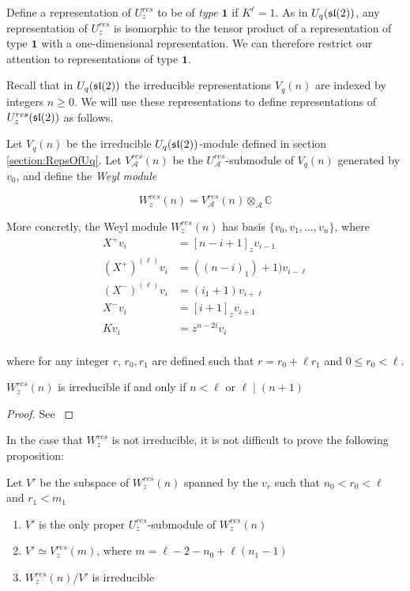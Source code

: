 Define a representation of $U_z^{res}$ to be of \emph{type $\mathbf{1}$} if
$K^\ell = 1$. As in $U_q(\mathfrak{sl}(2))$, any representation of $U_z^{res}$ is
isomorphic to the tensor product of a representation of type $\mathbf{1}$ with
a one-dimensional representation. We can therefore restrict our attention to
representations of type $\mathbf{1}$. 

Recall that in $U_q(\mathfrak{sl}(2))$ the irreducible representations $V_q(n)$ are
indexed by integers $n \geq 0$. We will use these representations to define
representations of $U_z^{res}(\mathfrak{sl}(2))$ as follows.

Let $V_q(n)$ be the irreducible $U_q(\mathfrak{sl}(2))$-module defined in section
\ref{section:RepsOfUq}.  Let $V_\mathcal{A}^{res}(n)$ be the
$U_\mathcal{A}^{res}$-submodule of $V_q(n)$ generated by $v_0$, and define the
\emph{Weyl module}

\begin{equation}
    W_z^{res}(n) = V_\mathcal{A}^{res}(n) \otimes_\mathcal{A} \mathbb{C}
\end{equation}


More concretly, the Weyl module $W_z^{res}(n)$ has basis $\{v_0, v_1, \ldots, v_n\}$, where
\begin{align}
    X^+ v_i &= [n-i+1]_z v_{i-1} \\
    (X^+)^{(\ell)} v_i &= ( (n-i)_1) + 1) v_{i-\ell} \\
    (X^-)^{(\ell)} v_i &= ( i_1 + 1) v_{i+\ell} \\
    X^-v_i &= [i+1]_z v_{i+1} \\
    Kv_i &= z^{n-2i} v_i \\
\end{align}

where for any integer $r$, $r_0,r_1$ are defined such that $r = r_0 + \ell r_1$
and $0 \leq r_0 < \ell$. 

\begin{claim} $W_z^{res}(n)$ is irreducible if and only if $n < \ell$ or $\ell \mid (n+1)$
\end{claim}
\begin{proof}
See \cite{CP}
\end{proof}

In the case that $W_z^{res}$ is not irreducible, it is not difficult to prove the following proposition:

\begin{prop}
Let $V'$ be the subspace of $W_z^{res}(n)$ spanned by the $v_r$ such that $n_0 < r_0 < \ell$ and $r_1 < m_1$
\begin{enumerate}
    \renewcommand{\labelenumi}{\roman{enumi})}
    \item $V'$ is the only proper $U_z^{res}$-submodule of $W_z^{res}(n)$
    \item $V' \simeq V_z^{res}(m)$, where $m = \ell - 2 - n_0 + \ell(n_1 - 1)$
    \item $W_z^{res}(n) / V'$ is irreducible
\end{enumerate}
\end{prop}


